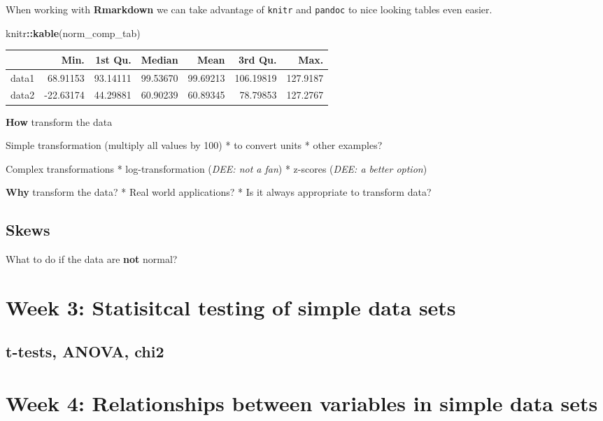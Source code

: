 \documentclass[
]{book}
\newenvironment{Shaded}{\begin{snugshade}}{\end{snugshade}}
\newcommand{\KeywordTok}[1]{\textcolor[rgb]{0.13,0.29,0.53}{\textbf{#1}}}
\newcommand{\NormalTok}[1]{#1}
\newcommand{\OperatorTok}[1]{\textcolor[rgb]{0.81,0.36,0.00}{\textbf{#1}}}
\begin{document}
When working with \textbf{Rmarkdown} we can take advantage of \texttt{knitr} and \texttt{pandoc} to nice looking tables even easier.

\begin{Shaded}
\begin{Highlighting}[]
\NormalTok{knitr}\OperatorTok{::}\KeywordTok{kable}\NormalTok{(norm_comp_tab)}
\end{Highlighting}
\end{Shaded}

\begin{tabular}{l|r|r|r|r|r|r}
\hline
  & Min. & 1st Qu. & Median & Mean & 3rd Qu. & Max.\\
\hline
data1 & 68.91153 & 93.14111 & 99.53670 & 99.69213 & 106.19819 & 127.9187\\
\hline
data2 & -22.63174 & 44.29881 & 60.90239 & 60.89345 & 78.79853 & 127.2767\\
\hline
\end{tabular}

\textbf{How} transform the data

Simple transformation (multiply all values by 100)
* to convert units
* other examples?

Complex transformations
* log-transformation (\emph{DEE: not a fan})
* z-scores (\emph{DEE: a better option})

\textbf{Why} transform the data?
* Real world applications?
* Is it always appropriate to transform data?

\hypertarget{skews}{%
\subsection{Skews}\label{skews}}

What to do if the data are \textbf{not} normal?

\hypertarget{week-3-statisitcal-testing-of-simple-data-sets-1}{%
\section{Week 3: Statisitcal testing of simple data sets}\label{week-3-statisitcal-testing-of-simple-data-sets-1}}

\hypertarget{t-tests-anova-chi2}{%
\subsection{t-tests, ANOVA, chi2}\label{t-tests-anova-chi2}}

\hypertarget{week-4-relationships-between-variables-in-simple-data-sets}{%
\section{Week 4: Relationships between variables in simple data sets}\label{week-4-relationships-between-variables-in-simple-data-sets}}
\end{document}
